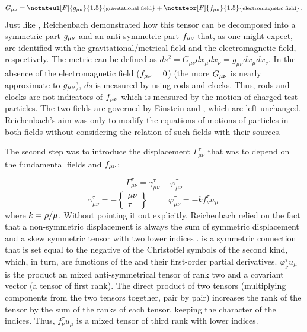 \documentclass[submitted]{article}
\newcommand{\texts}[1]{\text{\footnotesize{#1}}}
\newcommand{\faradaymn}{\ensuremath{f\mn}}
\newcommand{\ctmrd}{\ensuremath{\hfrac{\rho}{\mu}}\xspace}
\begin{document}
\begin{equation}
\label{eq:ft} 
G_{\mu\nu}=\notateul[F]{g_{\mu\nu}}{1.5}{\texts{gravitational field}}+\notateor[F]{f_{\mu\nu}}{1.5}{\texts{electromagnetic field}}\,.
\end{equation}
%
Just like \citet{Eddington1921}, Reichenbach demonstrated how this tensor can be decomposed into a symmetric part $g_{\mu\nu}$ and an anti-symmetric part $f_{\mu\nu}$ that, as one might expect, are identified with the gravitational/metrical field and the electromagnetic field, respectively. The metric can be defined as $d s^2=G_{\mu\nu}d x_\mu d x_\nu= g_{\mu\nu}d x_\mu d x_\nu$. In the absence of the electromagnetic field ($f_{\mu\nu}=0$) (the more $G_{\mu\nu}$ is nearly approximate to $g_{\mu\nu}$), $ds$ is measured by using rods and clocks. Thus, rods and clocks are not indicators of $f_{\mu\nu}$ which is measured by the motion of charged test particles. The two fields are governed by Einstein and \ME, which are left unchanged. Reichenbach's aim was only to modify the equations of motions of particles in both fields without considering the relation of such fields with their sources. 

The second step was to introduce the displacement $\Gamma_{\mu\nu}^{\tau}$ that was to depend on the fundamental fields \gmn and \faradaymn:

\begin{equation}
\label{eq:ds}
\Gamma_{\mu\nu}^{\tau}=\gamma_{\mu\nu}^{\tau}+\varphi_{\mu\nu}^{\tau}
\end{equation}
%
\begin{equation}
\label{eq:dsd}
\gamma^\tau_{\mu\nu}=-\begin{Bmatrix} \mu\nu \\ \tau \end{Bmatrix} \;\;\;\;\;\;\;\;\; \varphi^{\tau}_{\mu\nu}=-k f^\tau_\nu u_\mu\,
\end{equation}
%
where $k=\ctmrd$. Without pointing it out explicitly, Reichenbach relied on the fact that a non-symmetric displacement is always the sum of symmetric displacement and a skew symmetric tensor with two lower indices \citep[see][851]{Schouten1924}. \gtmn is a symmetric connection that is set equal to the negative of the Christoffel symbols of the second kind, which, in turn, are functions of the \gmn and their first-order partial derivatives. $\varphi^\tau_\nu u_\mu$ is the product an mixed anti-symmetrical tensor of rank two and a covariant vector (a tensor of first rank). The direct product of two tensors (multiplying components from the two tensors together, pair by pair) increases the rank of the tensor by the sum of the ranks of each tensor, keeping the character of the indices. Thus, $f^\tau_\nu u_\mu$ is a mixed tensor of third rank with lower indices.
\end{document}
